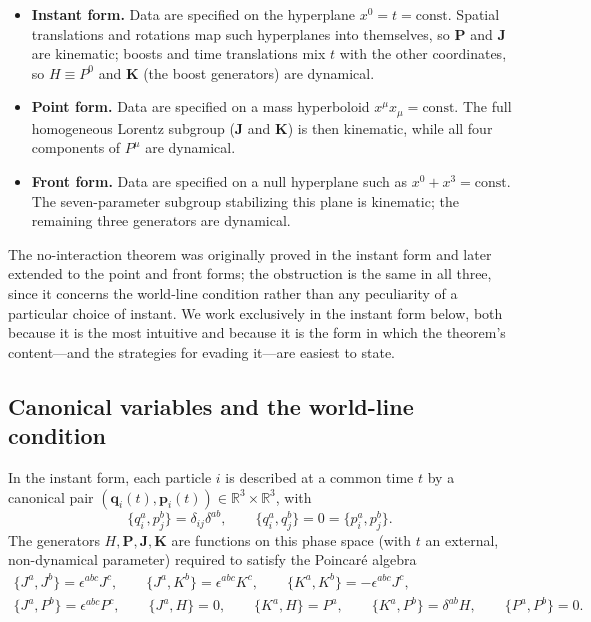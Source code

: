 \documentclass[11pt]{article}
\newcommand{\pb}[2]{\{#1,#2\}}
\newcommand{\bq}{\mathbf{q}}
\newcommand{\bp}{\mathbf{p}}
\newcommand{\bK}{\mathbf{K}}
\newcommand{\bJ}{\mathbf{J}}
\newcommand{\bP}{\mathbf{P}}
\newcommand{\R}{\mathbb{R}}
\begin{document}
\begin{itemize}[leftmargin=2em]
\item \textbf{Instant form.} Data are specified on the hyperplane $x^0=t=\text{const}$. Spatial translations and rotations map such hyperplanes into themselves, so $\bP$ and $\bJ$ are kinematic; boosts and time translations mix $t$ with the other coordinates, so $H\equiv P^0$ and $\bK$ (the boost generators) are dynamical.
\item \textbf{Point form.} Data are specified on a mass hyperboloid $x^\mu x_\mu=\text{const}$. The full homogeneous Lorentz subgroup ($\bJ$ and $\bK$) is then kinematic, while all four components of $P^\mu$ are dynamical.
\item \textbf{Front form.} Data are specified on a null hyperplane such as $x^0+x^3=\text{const}$. The seven-parameter subgroup stabilizing this plane is kinematic; the remaining three generators are dynamical.
\end{itemize}

The no-interaction theorem was originally proved in the instant form and later extended to the point and front forms; the obstruction is the same in all three, since it concerns the world-line condition rather than any peculiarity of a particular choice of instant. We work exclusively in the instant form below, both because it is the most intuitive and because it is the form in which the theorem's content---and the strategies for evading it---are easiest to state.

\subsection{Canonical variables and the world-line condition}
\label{sec:wlc}

In the instant form, each particle $i$ is described at a common time $t$ by a canonical pair $(\bq_i(t),\bp_i(t))\in\R^3\times\R^3$, with
\begin{equation}
\pb{q_i^a}{p_j^b}=\delta_{ij}\delta^{ab}, \qquad \pb{q_i^a}{q_j^b}=0=\pb{p_i^a}{p_j^b}.
\end{equation}
The generators $H,\bP,\bJ,\bK$ are functions on this phase space (with $t$ an external, non-dynamical parameter) required to satisfy the Poincar\'e algebra
\begin{gather}
\pb{J^a}{J^b}=\epsilon^{abc}J^c, \qquad \pb{J^a}{K^b}=\epsilon^{abc}K^c, \qquad \pb{K^a}{K^b}=-\epsilon^{abc}J^c, \label{eq:algebra1}\\
\pb{J^a}{P^b}=\epsilon^{abc}P^c, \qquad \pb{J^a}{H}=0, \qquad \pb{K^a}{H}=P^a, \qquad \pb{K^a}{P^b}=\delta^{ab}H, \qquad \pb{P^a}{P^b}=0. \label{eq:algebra2}
\end{gather}
\end{document}
